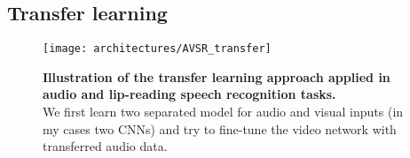 \subsection{Transfer learning}

\begin{figure}[H]
  \centering
  \texttt{[image: architectures/AVSR\_transfer]}\\[-1em]
  \caption{%
    \textbf{Illustration of the transfer learning approach applied in
      audio and lip-reading speech recognition tasks.}\\[0.1em]
    We first learn two separated model for audio and visual inputs
      (in my cases two CNNs) and try to fine-tune the video network
      with transferred audio data.
    }
  \label{fig:AVSR_transfer}
\end{figure}

\newpage

